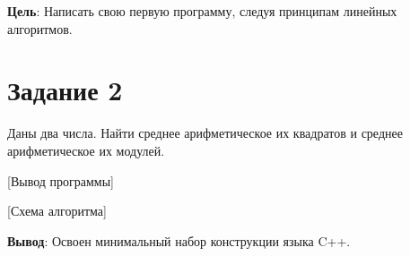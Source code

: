 \documentclass[variant=labwork]{bsuir}
\begin{document}
\maketitle

\textbf{Цель}: Написать свою первую программу, следуя принципам линейных
алгоритмов.

\section*{Задание 2}

Даны два числа. Найти среднее арифметическое их квадратов и среднее
арифметическое их модулей.


[Вывод программы]

[Схема алгоритма]

\textbf{Вывод}: Освоен минимальный набор конструкции языка C++.
\end{document}
